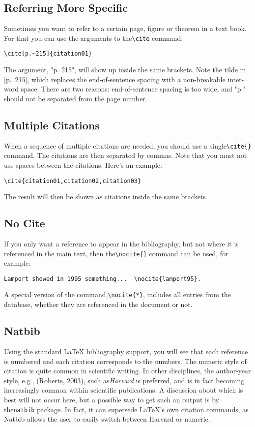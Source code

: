 \subsection{Referring More Specific}
Sometimes you want to refer to a certain page, figure or theorem in a text
book. For that you can use the arguments to the\verb|\cite| command:
\begin{lstlisting}
\cite[p.~215]{citation01}
\end{lstlisting}
The argument, "p. 215", will show up inside the same brackets. Note the tilde
in [p.~215], which replaces the end-of-sentence spacing with a non-breakable
inter-word space. There are two reasons: end-of-sentence spacing is too wide,
and "p." should not be separated from the page number.

\subsection{Multiple Citations}
When a sequence of multiple citations are needed, you should use a
single\verb|\cite{}| command. The citations are then separated by commas. Note
that you must not use spaces between the citations. Here's an example: 

\begin{lstlisting}
\cite{citation01,citation02,citation03}
\end{lstlisting}
The result will then be shown as citations inside the same brackets.

\subsection{No Cite}
If you only want a reference to appear in the bibliography, but not where it is
referenced in the main text, then the\verb|\nocite{}| command can be used, for
example:
\begin{lstlisting}
Lamport showed in 1995 something...  \nocite{lamport95}.
\end{lstlisting}

A special version of the command,\verb|\nocite{*}|, includes all entries from
the database, whether they are referenced in the document or not.

\subsection{Natbib}
Using the standard LaTeX bibliography support, you will see that each reference
is numbered and each citation corresponds to the numbers. The numeric style of
citation is quite common in scientific writing. In other disciplines, the
author-year style, e.g., (Roberts, 2003), such as\textit{Harvard} is preferred,
and is in fact becoming increasingly common within scientific publications. A
discussion about which is best will not occur here, but a possible way to get
such an output is by the\verb|natbib| package. In fact, it can supersede
LaTeX's own citation commands, as Natbib allows the user to easily switch
between Harvard or numeric.

